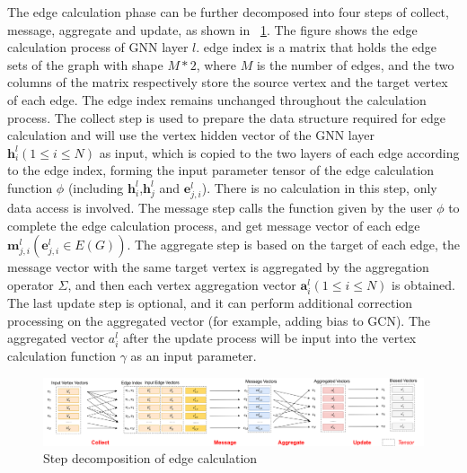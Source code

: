 The edge calculation phase can be further decomposed into four steps of collect, message, aggregate and update,
as shown in \figurename~\ref{fig:steps_in_edge_calculation}. The figure shows the edge calculation process of GNN layer $l$.
edge index is a matrix that holds the edge sets of the graph with shape $M*2$, where $M$ is the number of edges,
and the two columns of the matrix respectively store the source vertex and the target vertex of each edge.
The edge index remains unchanged throughout the calculation process.
The collect step is used to prepare the data structure required for edge calculation and will use the vertex hidden vector of the GNN layer $\boldsymbol{h}_i^l (1 \leq i \leq N)$
as input, which is copied to the two layers of each edge according to the edge index, forming the input parameter tensor of the edge calculation function $\phi$
(including $\boldsymbol{h}_i^l$,$\boldsymbol{h}_j^ l$ and $\boldsymbol{e}_{j, i}^l$).
There is no calculation in this step, only data access is involved. 
The message step calls the function given by the user $\phi$ to complete the edge calculation process, and get message vector of each edge $\boldsymbol{m}_{j, i}^l (\boldsymbol{e}_{j, i}^l \in E(G))$.
The aggregate step is based on the target of each edge, the message vector with the same target vertex is aggregated by the aggregation operator $\Sigma$,
and then each vertex aggregation vector $\boldsymbol{a}_i^l (1 \leq i \leq N)$ is obtained. 
The last update step is optional, and it can perform additional correction processing on the aggregated vector (for example, adding bias to GCN).
The aggregated vector $a_i^l$ after the update process will be input into the vertex calculation function $\gamma$ as an input parameter.

\begin{figure}
    \centering
    \includegraphics[width=1\columnwidth]{figs/illustration/steps_in_edge_calculation.png}
    \caption{Step decomposition of edge calculation}
    \label{fig:steps_in_edge_calculation}
\end{figure}

